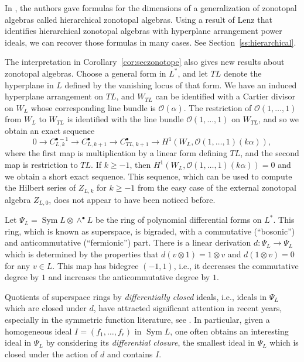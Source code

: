 \documentclass{amsart}
\theoremstyle{definition}
\begin{document}
In \cite{HoltzRonXu}, the authors gave formulas for the dimensions of a generalization of zonotopal algebras called hierarchical zonotopal algebras. Using a result of Lenz \cite{LenzHierarchical} that identifies hierarchical zonotopal algebras with hyperplane arrangement power ideals, we can recover those formulas in many cases. See Section~\ref{ss:hierarchical}. 

\medskip
The interpretation in Corollary~\ref{cor:seczonotope} also gives new results about zonotopal algebras. 
Choose a general form in $L^*$, and let $TL$ denote the hyperplane in 
$L$ defined by the vanishing locus of that form. We have an induced hyperplane arrangement on $TL$, and $W_{TL}$ can be identified with a Cartier divisor on $W_L$ whose corresponding line bundle is $\mathcal{O}(\alpha)$. The restriction of $\mathcal{O}(1, \dotsc, 1)$ from $W_L$ to $W_{TL}$ is identified with the line bundle $\mathcal{O}(1, \dotsc, 1)$ on $W_{TL}$, and so we obtain an exact sequence
\begin{equation}
0 \to C_{L, k}^{\bullet - 1} \to C_{L, k+1}^{\bullet} \to C_{TL, k+1}^{\bullet} \to H^1(W_L, \mathcal{O}(1, \dotsc, 1)(k\alpha)),
\end{equation}
where the first map is multiplication by a linear form defining $TL$, and the second map is restriction to $TL$. 
If $k \ge -1$, then $H^1(W_L, \mathcal{O}(1, \dotsc, 1)(k\alpha)) = 0$ and we obtain a short exact sequence. This sequence, which can be used to compute the Hilbert series of $Z_{L, k}$ for $k \ge -1$ from the easy case of the external zonotopal algebra $Z_{L,0}$, does not appear to have been noticed before. 


\medskip



Let $\Psi_L = \operatorname{Sym} L \otimes \wedge^{\bullet} L$ be the ring of polynomial differential forms on $L^*$. This ring, which is known as superspace, is bigraded, with a commutative (``bosonic'') and anticommutative (``fermionic'') part. There is a linear derivation  $d \colon \Psi_L \to \Psi_L$ which is determined by the properties that $d(v \otimes 1) = 1 \otimes v$ and $d(1 \otimes v) = 0$ for any $v \in L$. This map has bidegree $(-1, 1)$, i.e., it decreases the commutative degree by $1$ and increases the anticommutative degree by $1$. 

Quotients of superspace rings by \emph{differentially closed} ideals, i.e., ideals in $\Psi_L$ which are closed under $d$, have attracted significant attention in recent years, especially in the symmetric function literature, see \cites{KR,RW2,RW,Superspace,ACKMR}. In particular, given a homogeneous ideal $I = (f_1, \dotsc, f_r)$ in $\operatorname{Sym} L$, one often obtains an interesting ideal in $\Psi_L$ by considering its \emph{differential closure}, the smallest ideal in $\Psi_L$ which is closed under the action of $d$ and contains $I$. 
\end{document}
